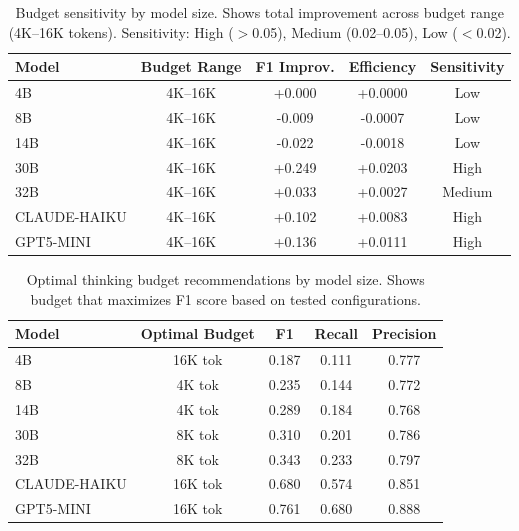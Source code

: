 \begin{table}[t]
\centering
\small
\caption{Budget sensitivity by model size. Shows total improvement across budget range (4K--16K tokens). Sensitivity: High ($>$0.05), Medium (0.02--0.05), Low ($<$0.02).}
\label{tab:budget_interaction}
\begin{tabular}{lcccc}
\toprule
\textbf{Model} & \textbf{Budget Range} & \textbf{F1 Improv.} & \textbf{Efficiency} & \textbf{Sensitivity} \\
\midrule
4B  & 4K--16K & +0.000 & +0.0000 & Low \\
8B  & 4K--16K & -0.009 & -0.0007 & Low \\
14B & 4K--16K & -0.022 & -0.0018 & Low \\
30B & 4K--16K & +0.249 & +0.0203 & High \\
32B & 4K--16K & +0.033 & +0.0027 & Medium \\
CLAUDE-HAIKU & 4K--16K & +0.102 & +0.0083 & High \\
GPT5-MINI & 4K--16K & +0.136 & +0.0111 & High \\
\bottomrule
\end{tabular}
\end{table}




\begin{table}[t]
\centering
\small
\caption{Optimal thinking budget recommendations by model size. Shows budget that maximizes F1 score based on tested configurations.}
\label{tab:optimal_budget}
\begin{tabular}{lcccc}
\toprule
\textbf{Model} & \textbf{Optimal Budget} & \textbf{F1} & \textbf{Recall} & \textbf{Precision} \\
\midrule
4B  & 16K  tok & 0.187 & 0.111 & 0.777 \\
8B  & 4K   tok & 0.235 & 0.144 & 0.772 \\
14B & 4K   tok & 0.289 & 0.184 & 0.768 \\
30B & 8K   tok & 0.310 & 0.201 & 0.786 \\
32B & 8K   tok & 0.343 & 0.233 & 0.797 \\
CLAUDE-HAIKU & 16K  tok & 0.680 & 0.574 & 0.851 \\
GPT5-MINI & 16K  tok & 0.761 & 0.680 & 0.888 \\
\bottomrule
\end{tabular}
\end{table}



